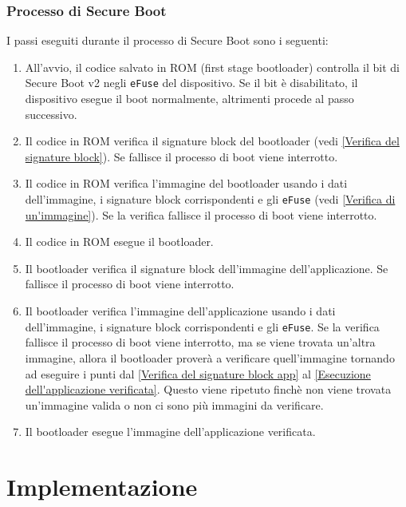 \documentclass[a4paper]{article}
\begin{document}
\subsubsection{Processo di Secure Boot}
I passi eseguiti durante il processo di Secure Boot sono i seguenti:
\begin{enumerate}
  \item All'avvio, il codice salvato in ROM (first stage bootloader) controlla
    il bit di Secure Boot v2 negli \texttt{eFuse} del dispositivo. Se il bit è
    disabilitato, il dispositivo esegue il boot normalmente, altrimenti procede al
    passo successivo.

  \item Il codice in ROM verifica il signature block del bootloader
    (vedi \ref{Verifica del signature block}). Se fallisce
    il processo di boot viene interrotto. 

  \item Il codice in ROM verifica l'immagine del bootloader usando i dati dell'immagine,
    i signature block corrispondenti e gli \texttt{eFuse} (vedi \ref{Verifica di un'immagine}).
    Se la verifica fallisce il processo di boot viene interrotto.

  \item Il codice in ROM esegue il bootloader.

  \item Il bootloader verifica il signature block dell'immagine dell'applicazione.
    Se fallisce il processo di boot viene interrotto. \label{Verifica del signature block app}

  \item Il bootloader verifica l'immagine dell'applicazione usando i dati dell'immagine,
    i signature block corrispondenti e gli \texttt{eFuse}.
    Se la verifica fallisce il processo di boot viene interrotto, ma se viene trovata
    un'altra immagine, allora il bootloader proverà a verificare quell'immagine tornando
    ad eseguire i punti dal \ref{Verifica del signature block app} al
    \ref{Esecuzione dell'applicazione verificata}. Questo viene ripetuto finchè non viene
    trovata un'immagine valida o non ci sono più immagini da verificare.

  \item \label{Esecuzione dell'applicazione verificata}
    Il bootloader esegue l'immagine dell'applicazione verificata.
\end{enumerate}

\section{Implementazione}
\end{document}
